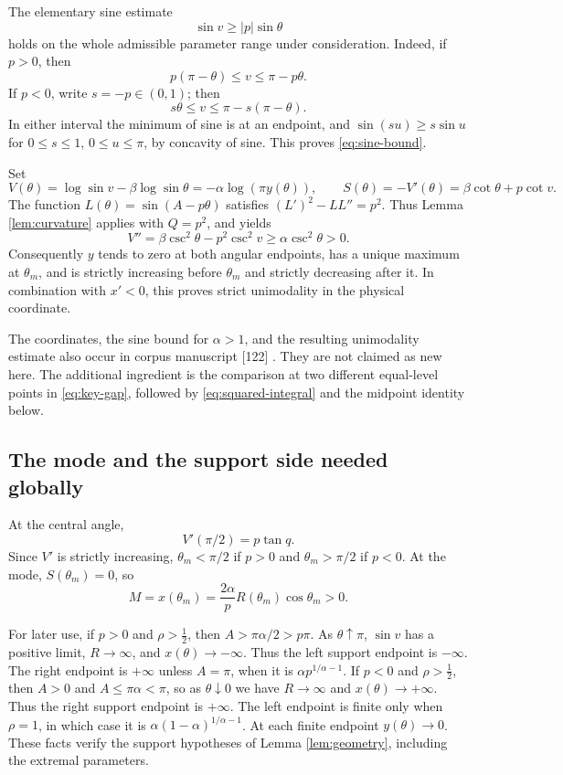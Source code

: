 \documentclass[11pt,a4paper]{article}
\theoremstyle{definition}
\theoremstyle{remark}
\numberwithin{equation}{section}
\begin{document}
The elementary sine estimate
\begin{equation}\label{eq:sine-bound}
 \sin v\ge |p|\sin\theta
\end{equation}
holds on the whole admissible parameter range under consideration.
Indeed, if $p>0$, then
\[
 p(\pi-\theta)\le v\le\pi-p\theta.
\]
If $p<0$, write $s=-p\in(0,1)$; then
\[
 s\theta\le v\le\pi-s(\pi-\theta).
\]
In either interval the minimum of sine is at an endpoint, and
$\sin(su)\ge s\sin u$ for $0\le s\le1$, $0\le u\le\pi$,
by concavity of sine. This proves \eqref{eq:sine-bound}.

Set
\begin{equation}\label{eq:stable-VS}
 V(\theta)=\log\sin v-\beta\log\sin\theta
          =-\alpha\log(\pi y(\theta)),
 \qquad
 S(\theta)=-V'(\theta)=\beta\cot\theta+p\cot v .
\end{equation}
The function $L(\theta)=\sin(A-p\theta)$ satisfies
$(L')^2-LL''=p^2$. Thus Lemma \ref{lem:curvature} applies with
$Q=p^2$, and yields
\begin{equation}\label{eq:stable-Vpp}
 V''=\beta\csc^2\theta-p^2\csc^2v
 \ge\alpha\csc^2\theta>0.
\end{equation}
Consequently $y$ tends to zero at both angular endpoints, has a
unique maximum at $\theta_m$, and is strictly increasing before
$\theta_m$ and strictly decreasing after it. In combination with
$x'<0$, this proves strict unimodality in the physical coordinate.

The coordinates, the sine bound for $\alpha>1$, and the resulting
unimodality estimate also occur in corpus manuscript [122]
\cite[Section 2]{Corpus122}. They are not claimed as new here.
The additional ingredient is the comparison at two different
equal-level points in \eqref{eq:key-gap}, followed by
\eqref{eq:squared-integral} and the midpoint identity below.

\subsection{The mode and the support side needed globally}

At the central angle,
\[
 V'(\pi/2)=p\tan q .
\]
Since $V'$ is strictly increasing, $\theta_m<\pi/2$ if $p>0$ and
$\theta_m>\pi/2$ if $p<0$. At the mode, $S(\theta_m)=0$, so
\begin{equation}\label{eq:mode-positive}
 M=x(\theta_m)
 =\frac{2\alpha}{p}R(\theta_m)\cos\theta_m>0 .
\end{equation}

For later use, if $p>0$ and $\rho>\tfrac12$, then
$A>\pi\alpha/2>p\pi$. As $\theta\uparrow\pi$,
$\sin v$ has a positive limit, $R\to\infty$, and $x(\theta)\to-\infty$.
Thus the left support endpoint is $-\infty$. The right endpoint
is $+\infty$ unless $A=\pi$, when it is
$\alpha p^{1/\alpha-1}$.
If $p<0$ and $\rho>\tfrac12$, then $A>0$ and $A\le\pi\alpha<\pi$,
so as $\theta\downarrow0$ we have $R\to\infty$ and $x(\theta)\to+\infty$.
Thus the right support endpoint is $+\infty$. The left endpoint is
finite only when $\rho=1$, in which case it is
$\alpha(1-\alpha)^{1/\alpha-1}$.
At each finite endpoint $y(\theta)\to0$. These facts verify the
support hypotheses of Lemma \ref{lem:geometry}, including the
extremal parameters.
\end{document}
